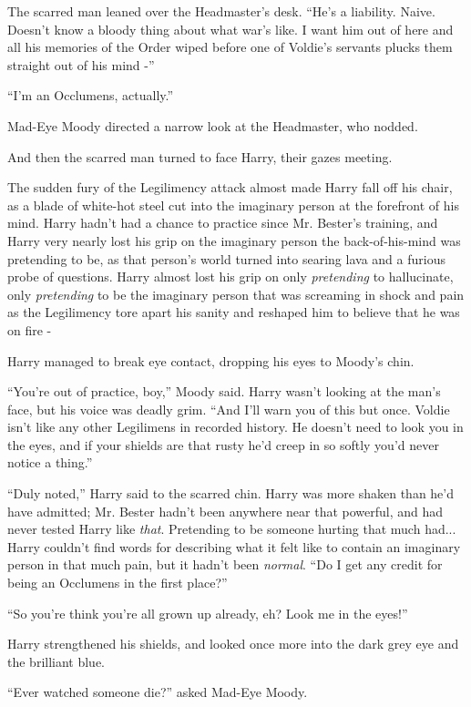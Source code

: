 The scarred man leaned over the Headmaster's desk. ``He's a liability.
Naive. Doesn't know a bloody thing about what war's like. I want him out
of here and all his memories of the Order wiped before one of Voldie's
servants plucks them straight out of his mind -''

``I'm an Occlumens, actually.''

Mad-Eye Moody directed a narrow look at the Headmaster, who nodded.

And then the scarred man turned to face Harry, their gazes meeting.

The sudden fury of the Legilimency attack almost made Harry fall off his
chair, as a blade of white-hot steel cut into the imaginary person at
the forefront of his mind. Harry hadn't had a chance to practice since
Mr. Bester's training, and Harry very nearly lost his grip on the
imaginary person the back-of-his-mind was pretending to be, as that
person's world turned into searing lava and a furious probe of
questions. Harry almost lost his grip on only \emph{pretending} to
hallucinate, only \emph{pretending} to be the imaginary person that was
screaming in shock and pain as the Legilimency tore apart his sanity and
reshaped him to believe that he was on fire -

Harry managed to break eye contact, dropping his eyes to Moody's chin.

``You're out of practice, boy,'' Moody said. Harry wasn't looking at the
man's face, but his voice was deadly grim. ``And I'll warn you of this
but once. Voldie isn't like any other Legilimens in recorded history. He
doesn't need to look you in the eyes, and if your shields are that rusty
he'd creep in so softly you'd never notice a thing.''

``Duly noted,'' Harry said to the scarred chin. Harry was more shaken
than he'd have admitted; Mr. Bester hadn't been anywhere near that
powerful, and had never tested Harry like \emph{that}. Pretending to be
someone hurting that much had... Harry couldn't find words for
describing what it felt like to contain an imaginary person in that much
pain, but it hadn't been \emph{normal}. ``Do I get any credit for being
an Occlumens in the first place?''

``So you're think you're all grown up already, eh? Look me in the
eyes!''

Harry strengthened his shields, and looked once more into the dark grey
eye and the brilliant blue.

``Ever watched someone die?'' asked Mad-Eye Moody.

